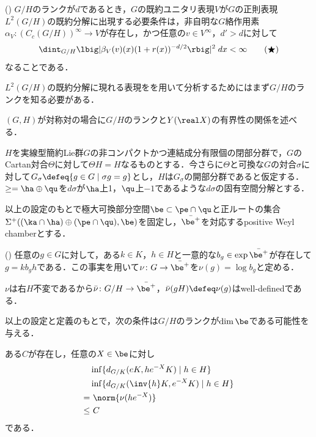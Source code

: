 \begin{thm*}(\cite[pp.~665--6]{ber88})\label{thm:plancherel}
  $G/H$のランクが$d$であるとき，$G$の既約ユニタリ表現$V$が$G$の正則表現$L^2(G/H)$の既約分解に出現する必要条件は，非自明な$G$絡作用素$\alpha_V\colon (C_c(G/H))^{\infty}\to V $が存在し，かつ任意の$v\in V^{\infty} $，$d' > d$に対して
  \begin{align}
    \dint_{G/H}\lbig|\beta_V(v)(x)(1+r(x))^{-d/2} \rbig|^2\; dx < \infty\label{eq:ber88}\tag{$\bigstar$}
  \end{align}
  なることである．%
\end{thm*}

$L^2(G/H)$の既約分解に現れる表現をを用いて分析するためにはまず$G/H$のランクを知る必要がある．

$(G,H)$が対称対の場合に$G/H$のランクと$Y(\real X) $の有界性の関係を述べる．
\begin{setting*}
  $H$を実線型簡約Lie群$G$の非コンパクトかつ連結成分有限個の閉部分群で，$G$のCartan対合$\Theta$に対して$\Theta H = H$なるものとする．今さらに$\Theta $と可換な$G$の対合$\sigma$に対して$G_{\sigma}\defeq \{g\in G \mid \sigma g = g \} $とし，$H$は$G_{\sigma} $の開部分群であると仮定する．$\ge = \ha\oplus \qu $を$d\sigma $が$\ha$上1，$\qu$上${-1}$であるような$d\sigma$の固有空間分解とする．

  以上の設定のもとで極大可換部分空間$\be\subset \pe\cap \qu $と正ルートの集合$\Sigma^{+}((\ka\cap\ha)\oplus(\pe\cap \qu), \be ) $を固定し，$\bar{\be^{+}} $を対応するpositive Weyl chamberとする．
\end{setting*}
\begin{thmdef*}(\cite[p.~151]{kk16})
  任意の$g\in G$に対して，ある$k\in K$，$h\in H$と一意的な$b_g\in \exp\bar{\be^{+}} $が存在して$g = kb_gh$である．この事実を用いて$\nu\colon G\to \bar{\be^{+}} $を$\nu(g) = \log b_{g} $と定める．
\end{thmdef*}

$\nu$は右$H$不変であるから$\bar{\nu}\colon G/H\to \bar{\be^{+}} $，$\bar{\nu}(gH) \defeq \nu(g) $はwell-definedである．

以上の設定と定義のもとで，次の条件は$G/H$のランクが$\dim \be $である可能性を与える．
\begin{cond*}
  ある$C$が存在し，任意の$X \in \be $に対し
  \begin{align*}
    &\inf\{d_{G/K}(eK,  he^{-X}K)\mid h\in H \}  \\
    &\inf\{d_{G/K}(\inv{h}K,  e^{-X}K)\mid h\in H \}  \\
    =&\ \norm{\nu(he^{-X})} \\
    \leq&\ C
  \end{align*}
  である．
\end{cond*}

